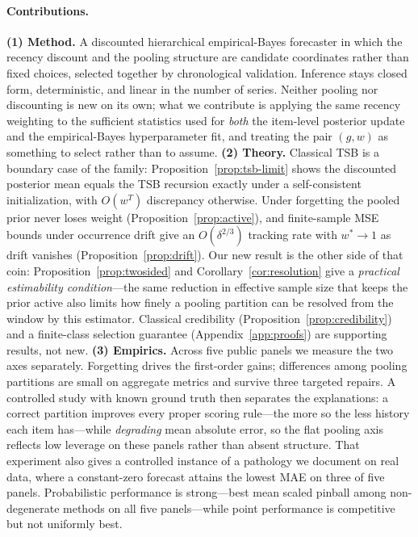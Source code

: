 \documentclass[twocolumn,10pt]{article}
\begin{document}
\paragraph{Contributions.}
\textbf{(1) Method.} A discounted hierarchical empirical-Bayes forecaster
in which the recency discount and the pooling structure are candidate
coordinates rather than fixed choices, selected together by chronological
validation. Inference stays closed form, deterministic, and linear in the
number of series. Neither pooling nor discounting is new on its own; what
we contribute is applying the same recency weighting to the sufficient
statistics used for \emph{both} the item-level posterior update and the
empirical-Bayes hyperparameter fit, and treating the pair $(g,w)$ as
something to select rather than to assume.
\textbf{(2) Theory.} Classical TSB is a boundary case of the family:
Proposition~\ref{prop:tsb-limit} shows the discounted posterior mean
equals the TSB recursion exactly under a self-consistent initialization,
with $O(w^{T})$ discrepancy otherwise. Under forgetting the pooled prior
never loses weight (Proposition~\ref{prop:active}), and finite-sample MSE
bounds under occurrence drift give an $O(\delta^{2/3})$ tracking rate with
$w^{*}\!\to\!1$ as drift vanishes (Proposition~\ref{prop:drift}). Our new
result is the other side of that coin: Proposition~\ref{prop:twosided}
and Corollary~\ref{cor:resolution} give a \emph{practical estimability
condition}---the same reduction in effective sample size that keeps the
prior active also limits how finely a pooling partition can be resolved
from the window by this estimator. Classical credibility
(Proposition~\ref{prop:credibility}) and a finite-class selection
guarantee (Appendix~\ref{app:proofs}) are supporting results, not new.
\textbf{(3) Empirics.} Across five public panels we measure the two axes
separately. Forgetting drives the first-order gains; differences among
pooling partitions are small on aggregate metrics and survive three
targeted repairs. A controlled study with known ground truth then
separates the explanations: a correct partition improves every proper
scoring rule---the more so the less history each item has---while
\emph{degrading} mean absolute error, so the flat pooling axis reflects
low leverage on these panels rather than absent structure. That
experiment also gives a controlled instance of a pathology we document on
real data, where a constant-zero forecast attains the lowest MAE on three
of five panels. Probabilistic performance is strong---best mean scaled
pinball among non-degenerate methods on all five panels---while point
performance is competitive but not uniformly best.
\end{document}
